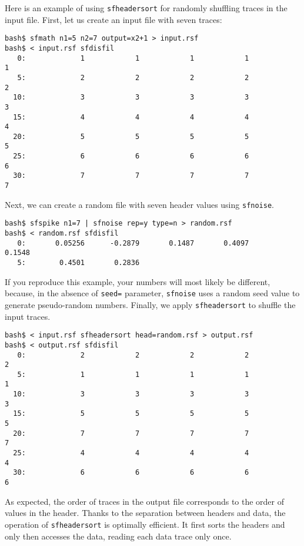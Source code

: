 Here is an example of using
\texttt{sfheadersort} for randomly shuffling traces in the input
file. First, let us create an input file with seven traces:
\begin{verbatim}
bash$ sfmath n1=5 n2=7 output=x2+1 > input.rsf
bash$ < input.rsf sfdisfil
   0:             1            1            1            1            1
   5:             2            2            2            2            2
  10:             3            3            3            3            3
  15:             4            4            4            4            4
  20:             5            5            5            5            5
  25:             6            6            6            6            6
  30:             7            7            7            7            7 
\end{verbatim}
Next, we can create a random file with seven header values using
\texttt{sfnoise}.
\begin{verbatim}
bash$ sfspike n1=7 | sfnoise rep=y type=n > random.rsf
bash$ < random.rsf sfdisfil
   0:       0.05256      -0.2879       0.1487       0.4097       0.1548
   5:        0.4501       0.2836
\end{verbatim}
If you reproduce this example, your numbers will most likely be different,
because, in the absence of \texttt{seed=} parameter, \texttt{sfnoise}
uses a random seed value to generate pseudo-random numbers. Finally, we
apply \texttt{sfheadersort} to shuffle the input traces.
\begin{verbatim}
bash$ < input.rsf sfheadersort head=random.rsf > output.rsf
bash$ < output.rsf sfdisfil
   0:             2            2            2            2            2
   5:             1            1            1            1            1
  10:             3            3            3            3            3
  15:             5            5            5            5            5
  20:             7            7            7            7            7
  25:             4            4            4            4            4
  30:             6            6            6            6            6
\end{verbatim}
As expected, the order of traces in the output file corresponds to the
order of values in the header. Thanks to the separation between
headers and data, the operation of \texttt{sfheadersort} is optimally
efficient. It first sorts the headers and only then accesses the data,
reading each data trace only once.

\noindent\doublebox{\parbox{\textwidth}{

}}

